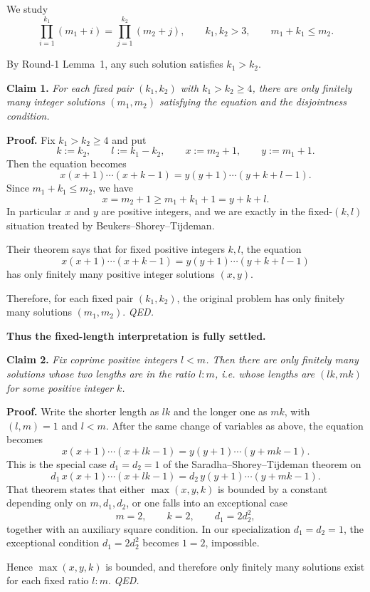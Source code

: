 We study
\[
\prod_{i=1}^{k_1}(m_1+i)=\prod_{j=1}^{k_2}(m_2+j),
\qquad
k_1,k_2>3,\qquad m_1+k_1\le m_2.
\]

By Round-1 Lemma~1, any such solution satisfies $k_1>k_2$.

\medskip
\noindent\textbf{Claim 1.}
\emph{For each fixed pair $(k_1,k_2)$ with $k_1>k_2\ge 4$, there are only finitely many integer solutions $(m_1,m_2)$ satisfying the equation and the disjointness condition.}

\medskip
\noindent\textbf{Proof.}
Fix $k_1>k_2\ge 4$ and put
\[
k:=k_2,\qquad l:=k_1-k_2,\qquad x:=m_2+1,\qquad y:=m_1+1.
\]
Then the equation becomes
\[
x(x+1)\cdots(x+k-1)=y(y+1)\cdots(y+k+l-1).
\]
Since $m_1+k_1\le m_2$, we have
\[
x=m_2+1\ge m_1+k_1+1=y+k+l.
\]
In particular $x$ and $y$ are positive integers, and we are exactly in the fixed-$(k,l)$ situation treated by Beukers--Shorey--Tijdeman.

Their theorem says that for fixed positive integers $k,l$, the equation
\[
x(x+1)\cdots(x+k-1)=y(y+1)\cdots(y+k+l-1)
\]
has only finitely many positive integer solutions $(x,y)$.

Therefore, for each fixed pair $(k_1,k_2)$, the original problem has only finitely many solutions $(m_1,m_2)$.
\hfill\textit{QED.}

\medskip
\noindent\textbf{Thus the fixed-length interpretation is fully settled.}

\medskip
\noindent\textbf{Claim 2.}
\emph{Fix coprime positive integers $l<m$.  Then there are only finitely many solutions whose two lengths are in the ratio $l:m$, i.e. whose lengths are $(lk,mk)$ for some positive integer $k$.}

\medskip
\noindent\textbf{Proof.}
Write the shorter length as $lk$ and the longer one as $mk$, with $(l,m)=1$ and $l<m$.
After the same change of variables as above, the equation becomes
\[
x(x+1)\cdots(x+lk-1)=y(y+1)\cdots(y+mk-1).
\]
This is the special case $d_1=d_2=1$ of the Saradha--Shorey--Tijdeman theorem on
\[
d_1\,x(x+1)\cdots(x+lk-1)=d_2\,y(y+1)\cdots(y+mk-1).
\]
That theorem states that either $\max(x,y,k)$ is bounded by a constant depending only on $m,d_1,d_2$, or one falls into an exceptional case
\[
m=2,\qquad k=2,\qquad d_1=2d_2^2,
\]
together with an auxiliary square condition.  In our specialization $d_1=d_2=1$, the exceptional condition $d_1=2d_2^2$ becomes $1=2$, impossible.

Hence $\max(x,y,k)$ is bounded, and therefore only finitely many solutions exist for each fixed ratio $l:m$.
\hfill\textit{QED.}


